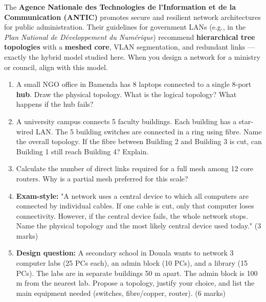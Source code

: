 \documentclass[11pt]{article}
\begin{document}
\begin{savaistu}
The \textbf{Agence Nationale des Technologies de l'Information et de la Communication (ANTIC)} promotes secure and resilient network architectures for public administration. Their guidelines for government LANs (e.g., in the \emph{Plan National de Développement du Numérique}) recommend \textbf{hierarchical tree topologies} with a \textbf{meshed core}, VLAN segmentation, and redundant links — exactly the hybrid model studied here. When you design a network for a ministry or council, align with this model.
\end{savaistu}

\begin{exercice}
\begin{enumerate}
\item A small NGO office in Bamenda has 8 laptops connected to a single 8-port \textbf{hub}. Draw the physical topology. What is the logical topology? What happens if the hub fails?
\item A university campus connects 5 faculty buildings. Each building has a star-wired LAN. The 5 building switches are connected in a ring using fibre. Name the overall topology. If the fibre between Building 2 and Building 3 is cut, can Building 1 still reach Building 4? Explain.
\item Calculate the number of direct links required for a full mesh among 12 core routers. Why is a partial mesh preferred for this scale?
\item \textbf{Exam-style:} "A network uses a central device to which all computers are connected by individual cables. If one cable is cut, only that computer loses connectivity. However, if the central device fails, the whole network stops. Name the physical topology and the most likely central device used today." (3 marks)
\item \textbf{Design question:} A secondary school in Douala wants to network 3 computer labs (25 PCs each), an admin block (10 PCs), and a library (15 PCs). The labs are in separate buildings 50 m apart. The admin block is 100 m from the nearest lab. Propose a topology, justify your choice, and list the main equipment needed (switches, fibre/copper, router). (6 marks)
\end{enumerate}
\end{exercice}
\end{document}
